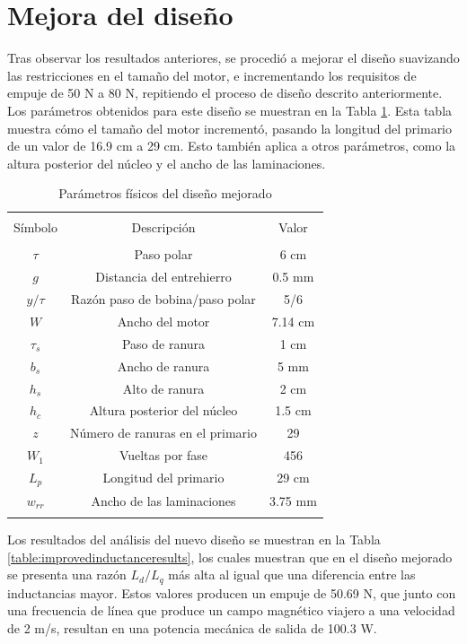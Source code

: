 \section{Mejora del diseño}
Tras observar los resultados anteriores, se procedió a mejorar el diseño suavizando las restricciones en el tamaño del motor, e incrementando los requisitos de empuje de 50 N a 80 N, repitiendo el proceso de diseño descrito anteriormente. Los parámetros obtenidos para este diseño se muestran en la Tabla \ref{table:physicalimprovedparams}. Esta tabla muestra cómo el tamaño del motor incrementó, pasando la longitud del primario de un valor de 16.9 cm a 29 cm. Esto también aplica a otros parámetros, como la altura posterior del núcleo y el ancho de las laminaciones. 

\begin{table}[t]
\centering
\caption{Parámetros físicos del diseño mejorado}
\label{table:physicalimprovedparams}
\begin{tabular}{c c c}
\hline\hline\\
Símbolo & Descripción & Valor \\
\hline\\
$\tau$ & Paso polar & 6 cm\\
$g$ & Distancia del entrehierro & 0.5 mm\\
$y/\tau$ & Razón paso de bobina/paso polar & 5/6\\
$W$ & Ancho del motor & 7.14 cm\\
$\tau_s$ & Paso de ranura & 1 cm\\
$b_s$ & Ancho de ranura & 5 mm\\
$h_s$ & Alto de ranura & 2 cm\\
$h_c$ & Altura posterior del núcleo & 1.5 cm\\
$z$ & Número de ranuras en el primario & 29\\
$W_1$ & Vueltas por fase & 456\\
$L_p$ & Longitud del primario & 29 cm\\
$w_{rr}$ & Ancho de las laminaciones & 3.75 mm\\
\hline\hline\\
\end{tabular}
\end{table}

Los resultados del análisis del nuevo diseño se muestran en la Tabla \ref{table:improvedinductanceresults}, los cuales muestran que en el diseño mejorado se presenta una razón $L_d/L_q$ más alta al igual que una diferencia entre las inductancias mayor. Estos valores producen un empuje de 50.69 N, que junto con una frecuencia de línea que produce un campo magnético viajero a una velocidad de 2 m/s, resultan en una potencia mecánica de salida de 100.3 W.

